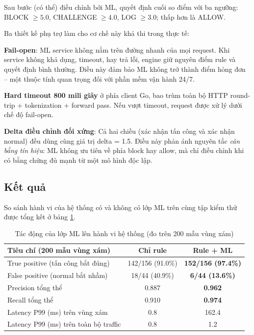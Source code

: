 \documentclass[../DoAn.tex]{subfiles}
\begin{document}
Sau bước (có thể) điều chỉnh bởi ML, quyết định cuối so điểm với ba ngưỡng:
BLOCK \(\ge 5.0\), CHALLENGE \(\ge 4.0\), LOG \(\ge 3.0\); thấp hơn là ALLOW.

Ba thiết kế phụ trợ làm cho cơ chế này khả thi trong thực tế:

\textbf{Fail-open}: ML service không nằm trên đường nhanh của mọi request.
Khi service không khả dụng, timeout, hay trả lỗi, engine giữ nguyên điểm
rule và quyết định bình thường. Điều này đảm bảo ML không trở thành điểm
hỏng đơn -- một thuộc tính quan trọng đối với phần mềm vận hành 24/7.

\textbf{Hard timeout 800 mili giây} ở phía client Go, bao trùm toàn bộ
HTTP round-trip + tokenization + forward pass. Nếu vượt timeout, request
được xử lý dưới chế độ fail-open.

\textbf{Delta điều chỉnh đối xứng}: Cả hai chiều (xác nhận tấn công và xác
nhận normal) đều dùng cùng giá trị delta = 1.5. Điều này phản ánh nguyên
tắc \textit{cân bằng tín hiệu}: ML không ưu tiên về phía block hay allow,
mà chỉ điều chỉnh khi có bằng chứng đủ mạnh từ một mô hình độc lập.

\subsection{Kết quả}
\label{subsection:5.1.3}

So sánh hành vi của hệ thống có và không có lớp ML trên cùng tập kiểm thử
được tổng kết ở bảng \ref{table:ml-impact}.

\begin{table}[h!]
\centering
\caption{Tác động của lớp ML lên hành vi hệ thống (đo trên 200 mẫu vùng xám)}
\label{table:ml-impact}
\small
\begin{tabular}{|l|c|c|}
\hline
\textbf{Tiêu chí (200 mẫu vùng xám)} & \textbf{Chỉ rule} & \textbf{Rule + ML} \\
\hline
True positive (tấn công bắt đúng) & 142/156 (91.0\%) & \textbf{152/156 (97.4\%)} \\
\hline
False positive (normal bắt nhầm) & 18/44 (40.9\%) & \textbf{6/44 (13.6\%)} \\
\hline
Precision tổng thể & 0.887 & \textbf{0.962} \\
\hline
Recall tổng thể & 0.910 & \textbf{0.974} \\
\hline
Latency P99 (ms) trên vùng xám & 0.8 & 162.4 \\
\hline
Latency P99 (ms) trên toàn bộ traffic & 0.8 & 1.2 \\
\hline
\end{tabular}
\end{table}
\end{document}
